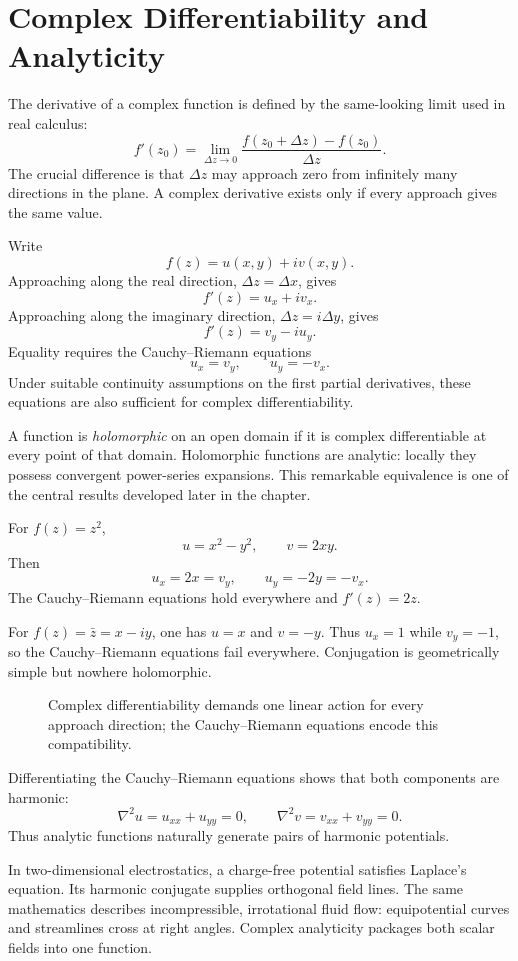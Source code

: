 \section{Complex Differentiability and Analyticity}
\label{sec:ch5-analyticity}

The derivative of a complex function is defined by the same-looking limit used in real calculus:
\[
f'(z_0)=\lim_{\Delta z\to0}\frac{f(z_0+\Delta z)-f(z_0)}{\Delta z}.
\]
The crucial difference is that $\Delta z$ may approach zero from infinitely many directions in the plane. A complex derivative exists only if every approach gives the same value.

Write
\[
f(z)=u(x,y)+iv(x,y).
\]
Approaching along the real direction, $\Delta z=\Delta x$, gives
\[
f'(z)=u_x+iv_x.
\]
Approaching along the imaginary direction, $\Delta z=i\Delta y$, gives
\[
f'(z)=v_y-iu_y.
\]
Equality requires the Cauchy--Riemann equations
\[
\boxed{u_x=v_y,\qquad u_y=-v_x}.
\]
Under suitable continuity assumptions on the first partial derivatives, these equations are also sufficient for complex differentiability.

\begin{definitionbox}
A function is \emph{holomorphic} on an open domain if it is complex differentiable at every point of that domain. Holomorphic functions are analytic: locally they possess convergent power-series expansions. This remarkable equivalence is one of the central results developed later in the chapter.
\end{definitionbox}

\begin{workedexample}
For $f(z)=z^2$,
\[
u=x^2-y^2,\qquad v=2xy.
\]
Then
\[
u_x=2x=v_y,\qquad u_y=-2y=-v_x.
\]
The Cauchy--Riemann equations hold everywhere and $f'(z)=2z$.
\end{workedexample}

For $f(z)=\bar z=x-iy$, one has $u=x$ and $v=-y$. Thus $u_x=1$ while $v_y=-1$, so the Cauchy--Riemann equations fail everywhere. Conjugation is geometrically simple but nowhere holomorphic.

\begin{figure}[htbp]
\centering

\caption{Complex differentiability demands one linear action for every approach direction; the Cauchy--Riemann equations encode this compatibility.}
\label{fig:ch5-cr-geometry}
\end{figure}

Differentiating the Cauchy--Riemann equations shows that both components are harmonic:
\[
\nabla^2u=u_{xx}+u_{yy}=0,
\qquad
\nabla^2v=v_{xx}+v_{yy}=0.
\]
Thus analytic functions naturally generate pairs of harmonic potentials.

\begin{physicalbox}
In two-dimensional electrostatics, a charge-free potential satisfies Laplace's equation. Its harmonic conjugate supplies orthogonal field lines. The same mathematics describes incompressible, irrotational fluid flow: equipotential curves and streamlines cross at right angles. Complex analyticity packages both scalar fields into one function.
\end{physicalbox}
